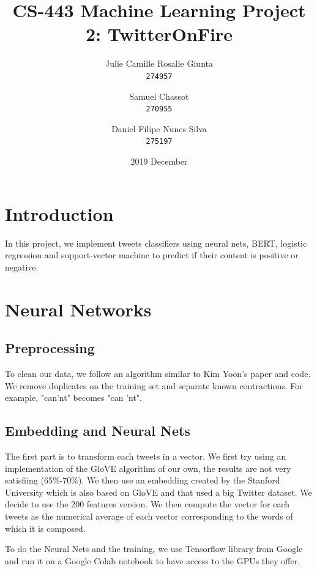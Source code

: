 \documentclass[11pt, a4paper, twocolumn]{article}
\begin{document}
\date{2019 December}
\title{CS-443 Machine Learning Project 2: TwitterOnFire}
\author{
  Julie Camille Rosalie Giunta\\
  \texttt{274957}
  \and
  Samuel Chassot\\
  \texttt{270955}
  \and
  Daniel Filipe Nunes Silva\\
  \texttt{275197}
}

\maketitle
\clearpage

\section{Introduction}
In this project, we implement tweets classifiers using neural nets, BERT, logistic regression and support-vector machine to predict if their content is positive or negative.

\section{Neural Networks}

\subsection{Preprocessing}
To clean our data, we follow an algorithm similar to Kim Yoon's paper\cite{kimyoonpaper} and code\cite{kimyooncode}. We remove duplicates on the training set and separate known contractions. For example, "can'nt" becomes "can 'nt".

\subsection{Embedding and Neural Nets}
The first part is to transform each tweets in a vector. We first try using an implementation of the 
GloVE algorithm of our own, the results are not very satisfiing (65\%-70\%). We then use an embedding 
created by the Stanford University which is also based on GloVE and that used a big Twitter dataset\cite{glovepaper, gloveembedding}. 
We decide to use the 200 features version.
We then compute the vector for each tweets as the numerical average of each vector corresponding to the 
words of which it is composed.

To do the Neural Nets and the training, we use Tensorflow library from Google and run it on a Google Colab notebook 
to have access to the GPUs they offer.
\end{document}
